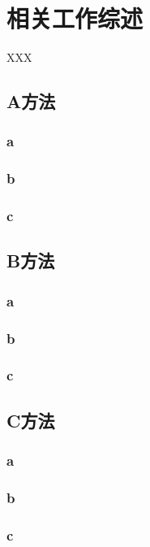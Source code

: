 \chapter{相关工作综述}
XXX
\section{A方法}

\subsection{a}
 
\subsection{b}

\subsection{c}

\section{B方法}

\subsection{a}
 
\subsection{b}

\subsection{c}

\section{C方法}

\subsection{a}
 
\subsection{b}

\subsection{c}